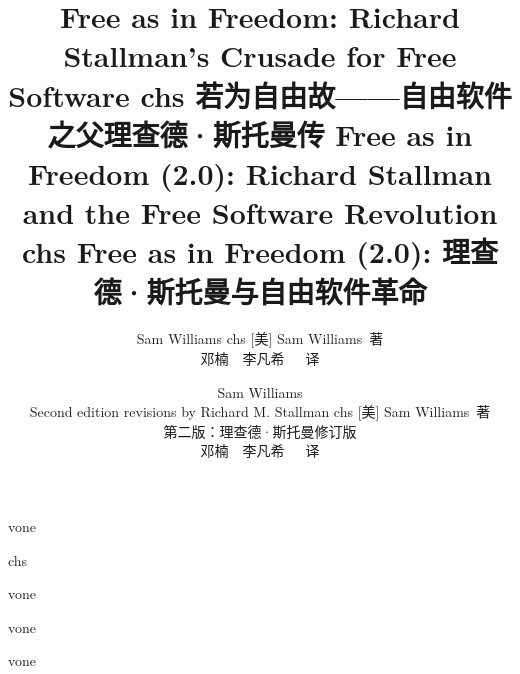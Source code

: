 \documentclass[UTF8, a5paper, 10pt]{book}
\def\chs{chs}
\def\vone{vone}
\begin{document}
\ifdefined\vone
\title{\ifdefined\eng
Free as in Freedom: Richard Stallman's Crusade for Free Software
\fi
\ifdefined\chs
若为自由故——自由软件之父理查德·斯托曼传
\fi
}
\author{\ifdefined\eng
Sam Williams
\fi
\ifdefined\chs
[美] Sam Williams\ 著\\
\bigskip
邓楠\ \ 李凡希\ \ \ 译
\fi}
\fi
\ifdefined\vtwo
\title{\ifdefined\eng
Free as in Freedom (2.0): Richard Stallman and the Free Software Revolution
\fi
\ifdefined\chs
Free as in Freedom (2.0): 理查德·斯托曼与自由软件革命
\fi
}
\author{\ifdefined\eng
Sam Williams \\ Second edition revisions by Richard M. Stallman
\fi
\ifdefined\chs
[美] Sam Williams\ 著\\ 第二版：理查德·斯托曼修订版 \\
\bigskip
邓楠\ \ 李凡希\ \ \ 译
\fi}
\fi
\date{}

\maketitle
\thispagestyle{empty}
\frontmatter
\ifdefined\vtwo

\fi
\thispagestyle{empty}
\ifdefined\chs
\renewcommand\contentsname{\textbf{目录}}
\fi
\tableofcontents
\ifdefined\vtwo


\fi
\ifdefined\vone


\fi
\mainmatter













\ifdefined\vone

\fi
\backmatter
\ifdefined\vtwo

\fi

\ifdefined\vone

\fi

\printindex
\ifdefined\vtwo

\fi
\end{document}
